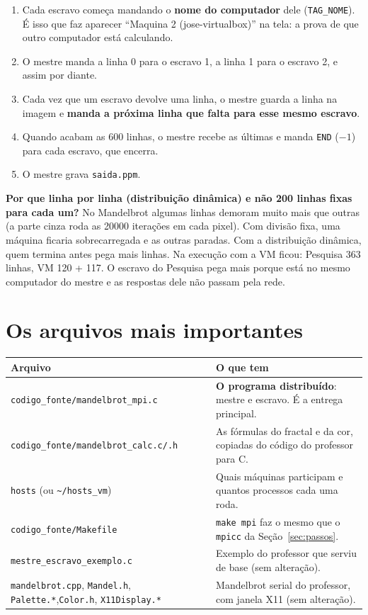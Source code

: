 \documentclass[a4paper,11pt]{article}
\begin{document}
\begin{enumerate}[leftmargin=*]
  \item Cada escravo começa mandando o \textbf{nome do computador} dele (\texttt{TAG\_NOME}). É isso que faz aparecer ``Maquina 2 (jose-virtualbox)'' na tela: a prova de que outro computador está calculando.
  \item O mestre manda a linha 0 para o escravo 1, a linha 1 para o escravo 2, e assim por diante.
  \item Cada vez que um escravo devolve uma linha, o mestre guarda a linha na imagem e \textbf{manda a próxima linha que falta para esse mesmo escravo}.
  \item Quando acabam as 600 linhas, o mestre recebe as últimas e manda \texttt{END} ($-1$) para cada escravo, que encerra.
  \item O mestre grava \texttt{saida.ppm}.
\end{enumerate}

\textbf{Por que linha por linha (distribuição dinâmica) e não 200 linhas fixas para cada um?} No Mandelbrot algumas linhas demoram muito mais que outras (a parte cinza roda as 20000 iterações em cada pixel). Com divisão fixa, uma máquina ficaria sobrecarregada e as outras paradas. Com a distribuição dinâmica, quem termina antes pega mais linhas. Na execução com a VM ficou: Pesquisa 363 linhas, VM 120 + 117. O escravo do Pesquisa pega mais porque está no mesmo computador do mestre e as respostas dele não passam pela rede.

\section{Os arquivos mais importantes}

\begin{center}
\begin{tabularx}{\textwidth}{|p{6.3cm}|X|}
\hline
\textbf{Arquivo} & \textbf{O que tem} \\ \hline
\texttt{codigo\_fonte/mandelbrot\_mpi.c} & \textbf{O programa distribuído}: mestre e escravo. É a entrega principal. \\ \hline
\texttt{codigo\_fonte/mandelbrot\_calc.c/.h} & As fórmulas do fractal e da cor, copiadas do código do professor para C. \\ \hline
\texttt{hosts} (ou \texttt{\textasciitilde/hosts\_vm}) & Quais máquinas participam e quantos processos cada uma roda. \\ \hline
\texttt{codigo\_fonte/Makefile} & \texttt{make mpi} faz o mesmo que o \texttt{mpicc} da Seção~\ref{sec:passos}. \\ \hline
\texttt{mestre\_escravo\_exemplo.c} & Exemplo do professor que serviu de base (sem alteração). \\ \hline
\texttt{mandelbrot.cpp}, \texttt{Mandel.h}, \texttt{Palette.*},\newline \texttt{Color.h}, \texttt{X11Display.*} & Mandelbrot serial do professor, com janela X11 (sem alteração). \\ \hline
\end{tabularx}
\end{center}
\end{document}

